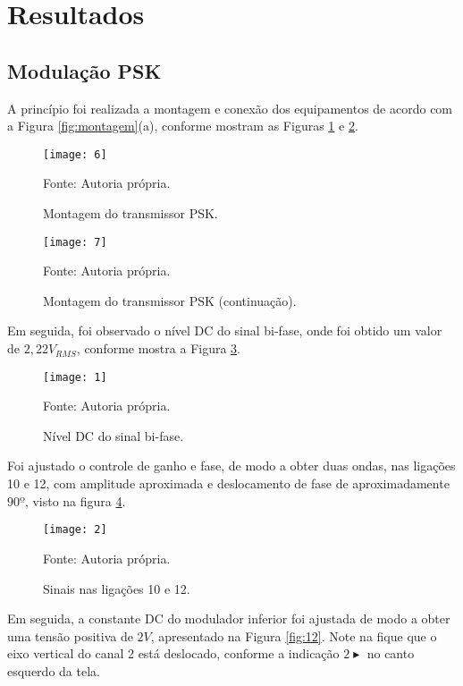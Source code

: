 \newpage
\section{Resultados}

\subsection{Modulação PSK}

	A princípio foi realizada a montagem e conexão dos equipamentos de acordo com a Figura \ref{fig:montagem}(a), conforme mostram as Figuras \ref{fig:6} e \ref{fig:7}.

	\begin{figure}[H]
		\centering
	  	\caption{Montagem do transmissor PSK.}
	   	\texttt{[image: 6]}
   	
	   	\small Fonte: Autoria própria.
	   	\label{fig:6}
	\end{figure}

	\begin{figure}[H]
	 	\centering
	 	\caption{Montagem do transmissor PSK (continuação).}
	 	\texttt{[image: 7]}
 	
	 	\small Fonte: Autoria própria.
	 	\label{fig:7}
	\end{figure}
	
	Em seguida, foi observado o nível DC do sinal bi-fase, onde foi obtido um valor de $2,22V_{RMS}$, conforme mostra a Figura \ref{fig:1}.
	
	\begin{figure}[H]
		\centering
		\caption{Nível DC do sinal bi-fase.}
		\texttt{[image: 1]}
		
		\small Fonte: Autoria própria.
		\label{fig:1}
	\end{figure}
	
	Foi ajustado o controle de ganho e fase, de modo a obter duas ondas, nas ligações 10 e 12, com amplitude aproximada e deslocamento de fase de aproximadamente $90º$, visto na figura \ref{fig:2}.

	\begin{figure}[H]
		\centering
		\caption{Sinais nas ligações 10 e 12.}
		\texttt{[image: 2]}
		
		\small Fonte: Autoria própria.
		\label{fig:2}
	\end{figure}	
	
	Em seguida, a constante DC do modulador inferior foi ajustada de modo a obter uma tensão positiva de $2V$, apresentado na Figura \ref{fig:12}. Note na fique que o eixo vertical do canal 2 está deslocado, conforme a indicação $2\blacktriangleright$ no canto esquerdo da tela.
	
